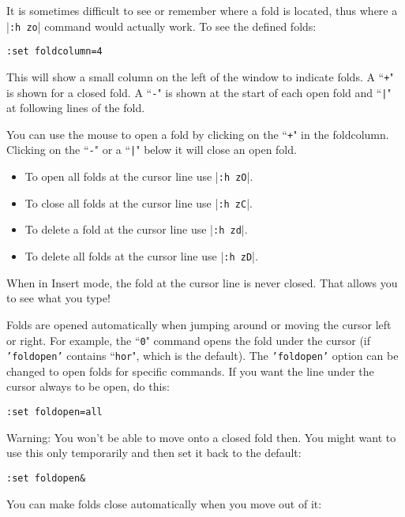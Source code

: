 It is sometimes difficult to see or remember where a fold is located, thus where a |\texttt{:h zo}| command would actually work.
To see the defined folds:

\begin{Verbatim}[samepage=true]
 :set foldcolumn=4
\end{Verbatim}

This will show a small column on the left of the window to indicate folds.
A ``\texttt{+}" is shown for a closed fold.
A ``\texttt{-}" is shown at the start of each open fold and ``\texttt{|}" at following lines of the fold.

You can use the mouse to open a fold by clicking on the ``\texttt{+}" in the foldcolumn.
Clicking on the ``\texttt{-}" or a ``\texttt{|}" below it will close an open fold.

\begin{itemize}
	\item To open all folds at the cursor line use |\texttt{:h zO}|.
	\item To close all folds at the cursor line use |\texttt{:h zC}|.
	\item To delete a fold at the cursor line use |\texttt{:h zd}|.
	\item To delete all folds at the cursor line use |\texttt{:h zD}|.
\end{itemize}


When in Insert mode, the fold at the cursor line is never closed.
That allows you to see what you type!

Folds are opened automatically when jumping around or moving the cursor left or right.
For example, the ``\texttt{0}" command opens the fold under the cursor (if \texttt{'foldopen'} contains ``\texttt{hor}", which is the default).
The \texttt{'foldopen'} option can be changed to open folds for specific commands.
If you want the line under the cursor always to be open, do this:

\begin{Verbatim}[samepage=true]
 :set foldopen=all
\end{Verbatim}

Warning: You won't be able to move onto a closed fold then.
You might want to use this only temporarily and then set it back to the default:

\begin{Verbatim}[samepage=true]
 :set foldopen&
\end{Verbatim}

You can make folds close automatically when you move out of it:

